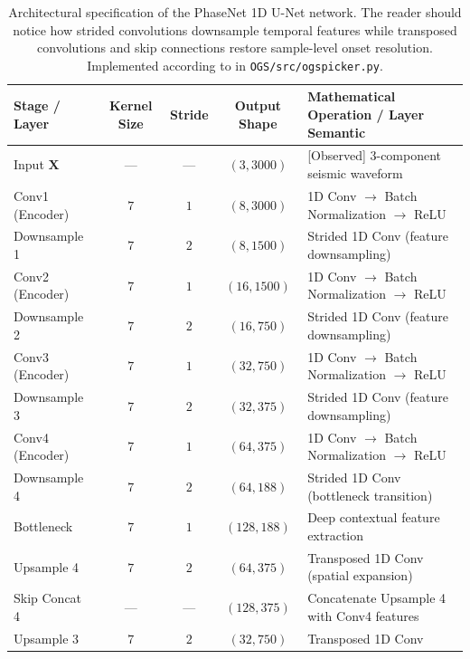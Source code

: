\begin{table}[htbp]
  \centering
  \small
  \caption{Architectural specification of the \ac{PhaseNet} 1D U-Net network.
    The reader should notice how strided convolutions downsample temporal
    features while transposed convolutions and skip connections restore
    sample-level onset resolution. Implemented according to \textcite{PhaseNet}
    in \texttt{OGS/src/ogspicker.py}.
  }
  \label{tab:phasenet_architecture}
  \begin{threeparttable}
    \begin{tabularx}{\linewidth}{l c c c X}
      \toprule
      \textbf{Stage / Layer} & \textbf{Kernel Size} &
      \textbf{Stride} & \textbf{Output Shape\tnote{a}} &
      \textbf{Mathematical Operation / Layer Semantic} \\
      \midrule
      Input $\mathbf{X}$ & --- & --- & $(3, \num{3000})$ & [Observed]
      3-component seismic waveform \\
      Conv1 (Encoder) & $7$ & $1$ & $(8, \num{3000})$ & 1D Conv $\to$
      Batch Normalization $\to$ ReLU \\
      Downsample 1 & $7$ & $2$ & $(8, \num{1500})$ & Strided 1D Conv
      (feature downsampling) \\
      Conv2 (Encoder) & $7$ & $1$ & $(16, \num{1500})$ & 1D Conv $\to$
      Batch Normalization $\to$ ReLU \\
      Downsample 2 & $7$ & $2$ & $(16, \num{750})$ & Strided 1D Conv
      (feature downsampling) \\
      Conv3 (Encoder) & $7$ & $1$ & $(32, \num{750})$ & 1D Conv $\to$
      Batch Normalization $\to$ ReLU \\
      Downsample 3 & $7$ & $2$ & $(32, \num{375})$ & Strided 1D Conv
      (feature downsampling) \\
      Conv4 (Encoder) & $7$ & $1$ & $(64, \num{375})$ & 1D Conv $\to$
      Batch Normalization $\to$ ReLU \\
      Downsample 4 & $7$ & $2$ & $(64, \num{188})$ & Strided 1D Conv
      (bottleneck transition) \\
      Bottleneck & $7$ & $1$ & $(128, \num{188})$ & Deep contextual
      feature extraction \\
      Upsample 4 & $7$ & $2$ & $(64, \num{375})$ & Transposed 1D Conv
      (spatial expansion) \\
      Skip Concat 4 & --- & --- & $(128, \num{375})$ & Concatenate
      Upsample 4 with Conv4 features \\
      Upsample 3 & $7$ & $2$ & $(32, \num{750})$ & Transposed 1D Conv

\end{tabularx}
\end{threeparttable}
\end{table}
